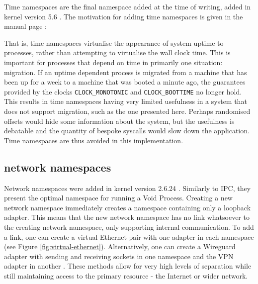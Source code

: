 \documentclass[sigplan]{acmart}
\begin{document}
Time namespaces are the final namespace added at the time of writing, added in kernel version 5.6 \citep{noauthor_linux_2020}. The motivation for adding time namespaces is given in the manual page \citep{free_software_foundation_time_namespaces7_2021}:


That is, time namespaces virtualise the appearance of system uptime to processes, rather than attempting to virtualise the wall clock time. This is important for processes that depend on time in primarily one situation: migration. If an uptime dependent process is migrated from a machine that has been up for a week to a machine that was booted a minute ago, the guarantees provided by the clocks \texttt{CLOCK\_MONOTONIC} and \texttt{CLOCK\_BOOTTIME} no longer hold. This results in time namespaces having very limited usefulness in a system that does not support migration, such as the one presented here. Perhaps randomised offsets would hide some information about the system, but the usefulness is debatable and the quantity of bespoke syscalls would slow down the application. Time namespaces are thus avoided in this implementation.

\subsection{network namespaces}
\label{sec:voiding-net}

Network namespaces were added in kernel version 2.6.24 \citep{noauthor_linux_2008}. Similarly to IPC, they present the optimal namespace for running a Void Process. Creating a new network namespace immediately creates a namespace containing only a loopback adapter. This means that the new network namespace has no link whatsoever to the creating network namespace, only supporting internal communication. To add a link, one can create a virtual Ethernet pair with one adapter in each namespace (see Figure \ref{fig:virtual-ethernet}). Alternatively, one can create a Wireguard adapter with sending and receiving sockets in one namespace and the VPN adapter in another \citep[§7.3]{donenfeld_wireguard_2017}. These methods allow for very high levels of separation while still maintaining access to the primary resource - the Internet or wider network.
\end{document}
